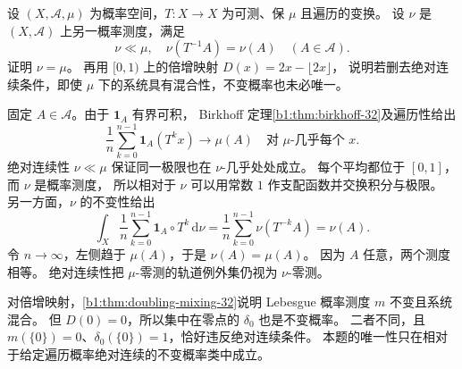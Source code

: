 \begin{exercise}\label{b1:ex:32-absolutely-continuous-invariant-probability}
设 \((X,\mathcal A,\mu)\) 为概率空间，\(T:X\to X\) 为可测、保 \(\mu\) 且遍历的变换。
设 \(\nu\) 是 \((X,\mathcal A)\) 上另一概率测度，满足
\[
 \nu\ll\mu,
 \quad\nu(T^{-1}A)=\nu(A)\quad(A\in\mathcal A).
\]
证明 \(\nu=\mu\)。
再用 \([0,1)\) 上的倍增映射 \(D(x)=2x-\lfloor2x\rfloor\)，
说明若删去绝对连续条件，即使 \(\mu\) 下的系统具有混合性，不变概率也未必唯一。
\end{exercise}
\begin{solution}
固定 \(A\in\mathcal A\)。由于 \(\mathbf1_A\) 有界可积，
Birkhoff 定理\cref{b1:thm:birkhoff-32}及遍历性给出
\[
 \frac1n\sum_{k=0}^{n-1}\mathbf1_A(T^kx)\longrightarrow\mu(A)
 \quad\text{对 }\mu\text{-几乎每个 }x.
\]
绝对连续性 \(\nu\ll\mu\) 保证同一极限也在 \(\nu\)-几乎处处成立。
每个平均都位于 \([0,1]\)，而 \(\nu\) 是概率测度，
所以相对于 \(\nu\) 可以用常数 \(1\) 作支配函数并交换积分与极限。
另一方面，\(\nu\) 的不变性给出
\[
 \int_X\frac1n\sum_{k=0}^{n-1}\mathbf1_A\circ T^k\,\mathrm d\nu
 =\frac1n\sum_{k=0}^{n-1}\nu(T^{-k}A)=\nu(A).
\]
令 \(n\to\infty\)，左侧趋于 \(\mu(A)\)，于是 \(\nu(A)=\mu(A)\)。
因为 \(A\) 任意，两个测度相等。
绝对连续性把 \(\mu\)-零测的轨道例外集仍视为 \(\nu\)-零测。

对倍增映射，\cref{b1:thm:doubling-mixing-32}说明 Lebesgue 概率测度 \(m\) 不变且系统混合。
但 \(D(0)=0\)，所以集中在零点的 \(\delta_0\) 也是不变概率。
二者不同，且 \(m(\{0\})=0\)、\(\delta_0(\{0\})=1\)，恰好违反绝对连续条件。
本题的唯一性只在相对于给定遍历概率绝对连续的不变概率类中成立。
\end{solution}


